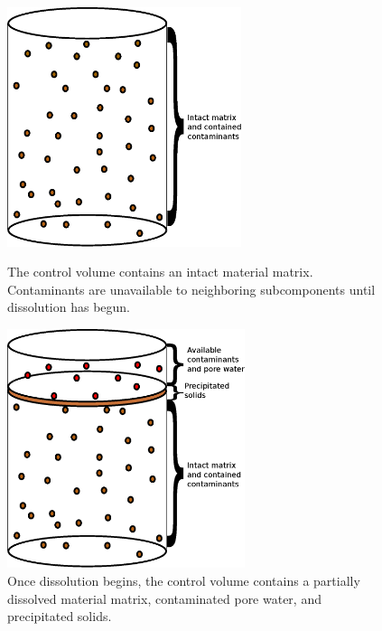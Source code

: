 \begin{figure}[h!]
\begin{minipage}[b]{0.5\linewidth}
  \begin{center}
    \includegraphics[height=7cm]{mixed_cell/mixed_cell_whole.eps}
  \end{center}
  \caption[Intact Mixed Cell Control Volume]{The control volume contains an 
  intact material matrix. Contaminants are unavailable to neighboring 
  subcomponents until dissolution has begun.}
  \label{fig:intact}
\end{minipage}
\hspace{0.5cm}
\begin{minipage}[b]{0.5\linewidth}
  \begin{center}
    \includegraphics[height=7cm]{mixed_cell/mixed_cell_degraded.eps}
  \end{center}
  \caption[Degrading Mixed Cell Control Volume]{Once dissolution begins, the 
  control volume contains a partially dissolved material matrix, contaminated 
  pore water, and precipitated solids.}
  \label{fig:dissolved}
\end{minipage}
\end{figure}


